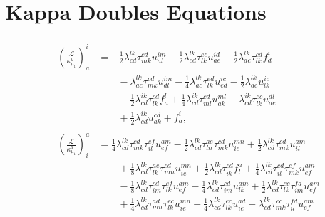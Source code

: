\section{Kappa Doubles Equations}
\label{app:kappa_equations}

\begin{align}
    &\begin{aligned}
        \left(\frac{\mathscr{L}}{\kappa^u_{\mu_1}} \right)^{i}_{a}
        &= - \frac{1}{2}\lambda^{lk}_{cd} \tau^{cd}_{mk} u^{im}_{al}
           - \frac{1}{2}\lambda^{lk}_{cd} \tau^{ec}_{lk} u^{id}_{ae}
           + \frac{1}{2}\lambda^{lk}_{ac} \tau^{cd}_{lk} f^{i}_{d}
        \\
        &\qquad
        - \lambda^{lk}_{ac} \tau^{cd}_{mk} u^{im}_{dl}
        - \frac{1}{4}\lambda^{lk}_{ac} \tau^{ed}_{lk} u^{ic}_{ed}
        - \frac{1}{2}\lambda^{lk}_{ac} u^{ic}_{lk}
        \\
        &\qquad
        - \frac{1}{2}\lambda^{ik}_{cd} \tau^{cd}_{lk} f^{l}_{a}
        + \frac{1}{4}\lambda^{ik}_{cd} \tau^{cd}_{ml} u^{ml}_{ak}
        - \lambda^{ik}_{cd} \tau^{ec}_{lk} u^{dl}_{ae}
        \\
        &\qquad
        + \frac{1}{2}\lambda^{ik}_{cd} u^{cd}_{ak} +
        f^{i}_{a},
    \end{aligned} \\
    &\begin{aligned}
        \left(\frac{\mathscr{L}}{\kappa^d_{\mu_1}} \right)^{a}_{i}
        &=
          \frac{1}{4}\lambda^{lk}_{cd} \tau^{cd}_{mk} \tau^{ef}_{il} u^{am}_{ef}
        - \frac{1}{2}\lambda^{lk}_{cd} \tau^{ae}_{ln} \tau^{cd}_{mk} u^{mn}_{ie}
        + \frac{1}{2}\lambda^{lk}_{cd} \tau^{cd}_{mk} u^{am}_{il}
        \\
        &\qquad
        + \frac{1}{8}\lambda^{lk}_{cd} \tau^{ae}_{lk} \tau^{cd}_{mn} u^{mn}_{ie}
        + \frac{1}{2}\lambda^{lk}_{cd} \tau^{cd}_{ik} f^{a}_{l}
        + \frac{1}{4}\lambda^{lk}_{cd} \tau^{cd}_{il} \tau^{ef}_{mk} u^{am}_{ef}
        \\
        &\qquad
        - \frac{1}{8}\lambda^{lk}_{cd} \tau^{cd}_{im} \tau^{ef}_{lk} u^{am}_{ef}
        - \frac{1}{4}\lambda^{lk}_{cd} \tau^{cd}_{im} u^{am}_{lk}
        + \frac{1}{2}\lambda^{lk}_{cd} \tau^{ec}_{lk} \tau^{fd}_{im} u^{am}_{ef}
        \\
        &\qquad
        + \frac{1}{4}\lambda^{lk}_{cd} \tau^{ad}_{mn} \tau^{ec}_{lk} u^{mn}_{ie}
        + \frac{1}{4}\lambda^{lk}_{cd} \tau^{ec}_{lk} u^{ad}_{ie}
        - \lambda^{lk}_{cd} \tau^{ec}_{mk} \tau^{fd}_{il} u^{am}_{ef}

\end{aligned}
\end{align}
